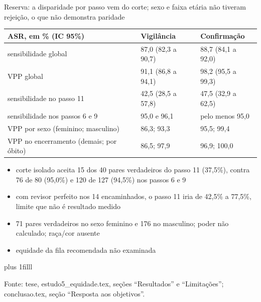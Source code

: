 \documentclass[aspectratio=169,11pt]{beamer}
\let\ressalvatexto\relax
\newcommand{\fontealign}{\raggedright}
\newcommand{\fonte}[2][tese, ]{\par\vskip 0pt plus 1filll
  \ifx\ressalvatexto\relax\else{\raggedright\footnotesize\color{black!70}\textit{Ressalva:} \ressalvatexto\par}\vskip 3pt\fi
  {\fontealign\tiny\color{black!65}Fonte: #1#2.\par}\vskip 3pt\global\let\ressalvatexto\relax}
\newcommand{\itens}[1]{\begin{itemize}#1\end{itemize}}
\begin{document}
\begin{frame}[label=R12]{Reserva: a disparidade por passo vem do corte; sexo e faixa etária não tiveram rejeição, o que não demonstra paridade}
\footnotesize
\renewcommand{\arraystretch}{0.8}
\begin{center}
\begin{tabular}{L{.3\textwidth}L{.3\textwidth}L{.3\textwidth}}
\toprule
ASR, em \% (IC 95\%) & Vigilância & Confirmação \\
\midrule
sensibilidade global & 87,0 (82,3 a 90,7) & 88,7 (84,1 a 92,0) \\
VPP global & 91,1 (86,8 a 94,1) & 98,2 (95,5 a 99,3) \\
sensibilidade no passo 11 & 42,5 (28,5 a 57,8) & 47,5 (32,9 a 62,5) \\
sensibilidade nos passos 6 e 9 & 95,0 e 96,1 & pelo menos 95,0 \\
VPP por sexo (feminino; masculino) & 86,3; 93,3 & 95,5; 99,4 \\
VPP no encerramento (demais; por óbito) & 86,5; 97,9 & 96,9; 100,0 \\
\bottomrule
\end{tabular}
\end{center}
\itens{\item corte isolado aceita 15 dos 40 pares verdadeiros do passo 11 (37,5\%), contra 76 de 80 (95,0\%) e 120 de 127 (94,5\%) nos passos 6 e 9
\item com revisor perfeito nos 14 encaminhados, o passo 11 iria de 42,5\% a 77,5\%, limite que não é resultado medido
\item 71 pares verdadeiros no sexo feminino e 176 no masculino; poder não calculado; raça/cor ausente
\item equidade da fila recomendada não examinada}
\fonte{estudo5\_equidade.tex, seções ``Resultados'' e ``Limitações''; conclusao.tex, seção ``Resposta aos objetivos''}
\end{frame}
\end{document}
